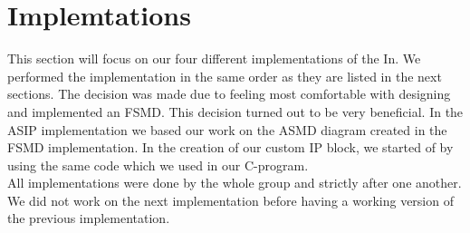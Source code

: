 \documentclass[conference]{IEEEtran}
\begin{document}
\section{Implemtations}
This section will focus on our four different implementations of the In. We performed the implementation in the same order as they are listed in the next sections. The decision was made due to feeling most comfortable with designing and implemented an FSMD. This decision turned out to be very beneficial. In the ASIP implementation we based our work on the ASMD diagram created in the FSMD implementation. In the creation of our custom IP block, we started of by using the same code which we used in our C-program. \\
All implementations were done by the whole group and strictly after one another. We did not work on the next implementation before having a working version of the previous implementation.
\end{document}

